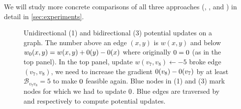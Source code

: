 We will study more concrete comparisons of all three approaches (\algsl, \algsp, and \algbp) in detail in \cref{sec:experiments}.

\begin{figure}[!htb]
  \centering
  
  \caption{
      Unidirectional (1) and bidirectional (3) potential updates on a graph.
      The number above an edge $(x, y)$ is $w(x, y)$ and below $\wpot(x, y) = w(x, y) + \pot(y) - \pot(x)$ where originally $\pot = 0$ (as in the top panel).
      In the top panel, update $w(v_7, v_8) \gets -5$ broke edge $(v_7, v_8)$, \ie we need to increase the gradient $\pot(v_8) - \pot(v_7)$ by at least $\mathcal{B}_{v_7v_8} = 5$ to make $\pot$ feasible again.
      Blue nodes in (1) and (3) mark nodes for which we had to update $\pot$.
      Blue edges are traversed by \algdk and \algbd respectively to compute potential updates.
  }
  \label{fig:pot_updates}
\end{figure}




